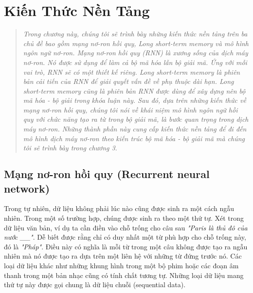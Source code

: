 \chapter{Kiến Thức Nền Tảng}
\ifpdf
    \graphicspath{{Chapter2/Chapter2Figs/PNG/}{Chapter2/Chapter2Figs/PDF/}{Chapter2/Chapter2Figs/}}
\else
    \graphicspath{{Chapter2/Chapter2Figs/EPS/}{Chapter2/Chapter2Figs/}}
\fi

\begin{quote}

\textit{Trong chương này, chúng tôi sẽ trình bày những kiến thức nền tảng trên ba chủ đề bao gồm mạng nơ-ron hồi quy, Long short-term memory và mô hình ngôn ngữ nơ-ron. Mạng nơ-ron hồi quy (RNN) là xương sống của dịch máy nơ-ron. Nó được sử dụng để làm cả bộ mã hóa lẫn bộ giải mã. Ứng với mỗi vai trò, RNN sẽ có một thiết kế riêng. Long short-term memory là phiên bản cải tiến của RNN để giải quyết vấn đề về phụ thuộc dài hạn. Long short-term memory cũng là phiên bản RNN được dùng để xây dựng nên bộ mã hóa - bộ giải trong khóa luận này. Sau đó, dựa trên những kiến thức về mạng nơ-ron hồi quy, chúng tôi nói về khái niệm \textit{mô hình ngôn ngữ hồi quy} với chức năng tạo ra từ trong bộ giải mã, là bước quan trọng trong dịch máy nơ-ron. Những thành phần này cung cấp kiến thức nền tảng để đi đến mô hình dịch máy nơ-ron theo kiến trúc bộ mã hóa - bộ giải mã mà chúng tôi sẽ trình bày trong chương 3}.

\end{quote}
\section{Mạng nơ-ron hồi quy (Recurrent neural network)}

Trong tự nhiên, dữ liệu không phải lúc nào cũng được sinh ra một cách ngẫu nhiên. Trong một số trường hợp, chúng được sinh ra theo một thứ tự. Xét trong dữ liệu văn bản, ví dụ ta cần điền vào chỗ trống cho câu sau \textit{"Paris là thủ đô của nước \_\_"}. Dễ biết được rằng chỉ có duy nhất một từ phù hợp cho chỗ trống này, đó là \textit{"Pháp"}. Điều này có nghĩa là mỗi từ trong một câu không được tạo ra ngẫu nhiên mà nó được tạo ra dựa trên một liên hệ với những từ đứng trước nó. Các loại dữ liệu khác như những khung hình trong một bộ phim hoặc các đoạn âm thanh trong một bản nhạc cũng có tính chất tương tự. Những loại dữ liệu mang thứ tự này được gọi chung là dữ liệu chuỗi (sequential data).

